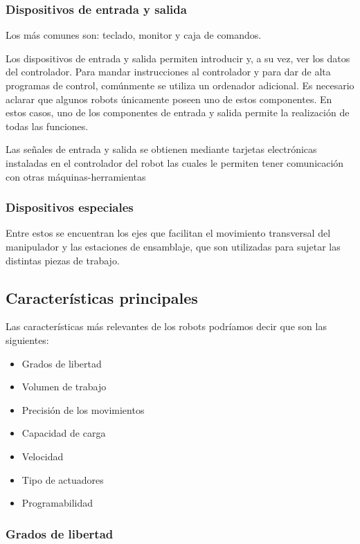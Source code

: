 \documentclass[12pt,a4papert,woside,openright,titlepage,final]{book}
\begin{document}
\subsubsection{Dispositivos de entrada y salida}
Los más comunes son: teclado, monitor y caja de comandos.

Los dispositivos de entrada y salida permiten introducir y, a su vez, ver los
datos del controlador. Para mandar instrucciones al controlador y para dar de
alta programas de control, comúnmente se utiliza un ordenador adicional. Es
necesario aclarar que algunos robots únicamente poseen uno de estos componentes.
En estos casos, uno de los componentes de entrada y salida permite la
realización de todas las funciones.

Las señales de entrada y salida se obtienen mediante tarjetas electrónicas
instaladas en el controlador del robot las cuales le permiten tener comunicación
con otras máquinas-herramientas


\subsubsection{Dispositivos especiales}
Entre estos se encuentran los ejes que facilitan el movimiento transversal del
manipulador y las estaciones de ensamblaje, que son utilizadas para sujetar las
distintas piezas de trabajo.



\subsection{Características principales}

Las características más relevantes de los robots podríamos decir que son las
siguientes:

\begin{itemize}
    \item Grados de libertad
    \item Volumen de trabajo
    \item Precisión de los movimientos
    \item Capacidad de carga
    \item Velocidad
    \item Tipo de actuadores
    \item Programabilidad
\end{itemize}
 

    
\subsubsection{Grados de libertad}
\end{document}

